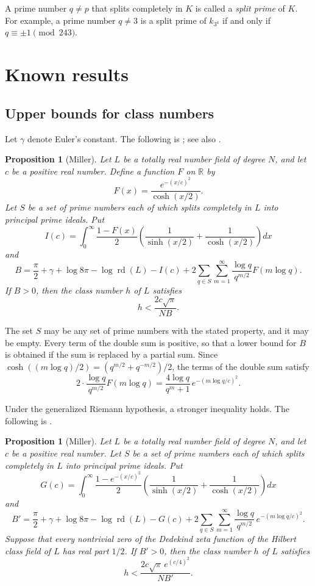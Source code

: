 \documentclass[11pt]{amsart}
\theoremstyle{plain}
\newtheorem{proposition}[theorem]{Proposition}
\theoremstyle{definition}
\begin{document}
A prime number $q \ne p$ that splits completely in $K$ is called a \emph{split prime} of $K$.
For example, a prime number $q \ne 3$ is a split prime of $k_{3^4}$ if and only if $q \equiv \pm 1 \pmod{243}$.

\section{Known results} \label{sec:known}

\subsection{Upper bounds for class numbers}

Let $\gamma$ denote Euler's constant.
The following is \cite[Lemma 5.1]{Mi14}; see also \cite[Lemma 1]{Mi15b}.

\begin{proposition}[Miller] \label{prop:miller}
Let $L$ be a totally real number field of degree $N$, and let $c$ be a positive real number.
Define a function $F$ on $\mathbb{R}$ by
\[
F(x) = \frac{e^{-(x/c)^2}}{\cosh(x/2)} .
\]
Let $S$ be a set of prime numbers each of which splits completely in $L$ into principal prime ideals.
Put
\[
I(c) = \int_0^\infty \frac{1 - F(x)}{2} \left( \frac{1}{\sinh(x/2)} + \frac{1}{\cosh(x/2)} \right) dx
\]
and
\[
B = \frac{\pi}{2} + \gamma + \log 8\pi - \log \operatorname{rd}(L) - I(c) + 2 \sum_{q \in S} \sum_{m=1}^{\infty} \frac{\log q}{q^{m/2}} F(m \log q) .
\]
If $B > 0$, then the class number $h$ of $L$ satisfies
\[
h < \frac{2c\sqrt{\pi}}{N B} .
\]
\end{proposition}

The set $S$ may be any set of prime numbers with the stated property, and it may be empty.
Every term of the double sum is positive, so that a lower bound for $B$ is obtained if the sum is replaced by a partial sum.
Since $\cosh((m \log q)/2) = (q^{m/2} + q^{-m/2})/2$, the terms of the double sum satisfy
\begin{equation} \label{eq:term}
2 \cdot \frac{\log q}{q^{m/2}} F(m \log q) = \frac{4 \log q}{q^m + 1} \, e^{-(m \log q/c)^2} .
\end{equation}

Under the generalized Riemann hypothesis, a stronger inequality holds.
The following is \cite[Lemma 5.2]{Mi14}.

\begin{proposition}[Miller] \label{prop:millergrh}
Let $L$ be a totally real number field of degree $N$, and let $c$ be a positive real number.
Let $S$ be a set of prime numbers each of which splits completely in $L$ into principal prime ideals.
Put
\[
G(c) = \int_0^\infty \frac{1 - e^{-(x/c)^2}}{2} \left( \frac{1}{\sinh(x/2)} + \frac{1}{\cosh(x/2)} \right) dx
\]
and
\[
B' = \frac{\pi}{2} + \gamma + \log 8\pi - \log \operatorname{rd}(L) - G(c) + 2 \sum_{q \in S} \sum_{m=1}^{\infty} \frac{\log q}{q^{m/2}} \, e^{-(m \log q/c)^2} .
\]
Suppose that every nontrivial zero of the Dedekind zeta function of the Hilbert class field of $L$ has real part $1/2$.
If $B' > 0$, then the class number $h$ of $L$ satisfies
\[
h < \frac{2c\sqrt{\pi} \, e^{(c/4)^2}}{N B'} .
\]
\end{proposition}
\end{document}
